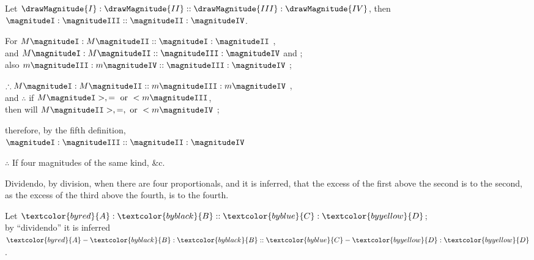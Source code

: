 \documentclass[booklanguage=english]{byrnebook}
\begin{document}
\vfill\pagebreak

\label{prop:V.XVI}

\begin{center}
Let $\drawMagnitude{I} : \drawMagnitude{II} :: \drawMagnitude{III} : \drawMagnitude{IV}$, then $\magnitudeI : \magnitudeIII :: \magnitudeII : \magnitudeIV$.

For $M \magnitudeI : M \magnitudeII :: \magnitudeI : \magnitudeII$ ,\\
and $M \magnitudeI : M \magnitudeII :: \magnitudeIII : \magnitudeIV$ \byref{\hypref} and ;\\
also $m \magnitudeIII : m \magnitudeIV :: \magnitudeIII : \magnitudeIV$ ;

$\therefore M \magnitudeI : M \magnitudeII :: m \magnitudeIII : m \magnitudeIV$ ,\\
and $\therefore$ if $M \magnitudeI >, = \mbox { or } < m \magnitudeIII$,\\
then will $M \magnitudeII >, =, \mbox{ or } < m \magnitudeIV$ ;

therefore, by the fifth definition,\\
 $\magnitudeI : \magnitudeIII :: \magnitudeII : \magnitudeIV$

 $\therefore$ If four magnitudes of the same kind, \&c.
\end{center}

\label{def:V.XVI} 
\def\varA{\textcolor{byred}{A}}
\def\varB{\textcolor{byblack}{B}}
\def\varC{\textcolor{byblue}{C}}
\def\varD{\textcolor{byyellow}{D}}
Dividendo, by division, when there are four proportionals, and it is inferred, that the excess of the first above the second is to the second, as the excess of the third above the fourth, is to the fourth.

\begin{center}
Let $\varA : \varB :: \varC : \varD$;\\
by \enquote{dividendo} it is inferred\\
$\varA - \varB : \varB :: \varC - \varD : \varD$. %
\end{center}
\end{document}
